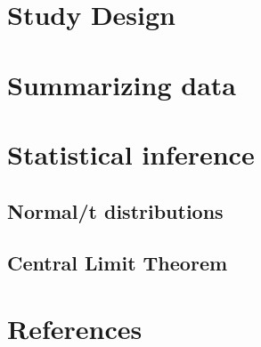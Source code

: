 \documentclass{beamer}
\begin{document}
\section{Study Design}

\section{Summarizing data}

\section{Statistical inference}

\subsection{Normal/t distributions}

\subsection{Central Limit Theorem}

\section*{References}
\begin{frame}
\end{frame}
\end{document}
